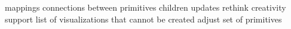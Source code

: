 \label{discussion}

mappings
connections between primitives
children updates
rethink creativity support
\label{setPrimitives}
list of visualizations that cannot be created
adjust set of primitives

